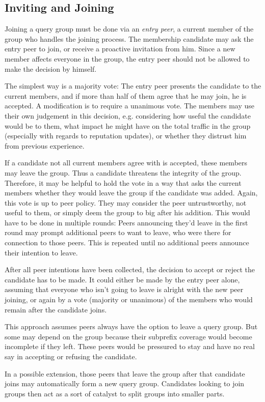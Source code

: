 \subsection{Inviting and Joining}
Joining a query group must be done via an \emph{entry peer}, a current member of
the group who handles the joining process. The membership candidate may ask the
entry peer to join, or receive a proactive invitation from him. Since a new
member affects everyone in the group, the entry peer should not be allowed to
make the decision by himself.

The simplest way is a majority vote: The entry peer presents the candidate to
the current members, and if more than half of them agree that he may join, he is
accepted. A modification is to require a unanimous vote. The members may use
their own judgement in this decision, e.g. considering how useful the candidate
would be to them, what impact he might have on the total traffic in the group
(especially with regards to reputation updates), or whether they distrust him
from previous experience.

If a candidate not all current members agree with is accepted, these members may
leave the group. Thus a candidate threatens the integrity of the group.
Therefore, it may be helpful to hold the vote in a way that asks the current
members whether they would leave the group if the candidate was added. Again,
this vote is up to peer policy. They may consider the peer untrustworthy, not
useful to them, or simply deem the group to big after his addition. This would
have to be done in multiple rounds: Peers announcing they'd leave in the first
round may prompt additional peers to want to leave, who were there for
connection to those peers. This is repeated until no additional peers announce
their intention to leave.

After all peer intentions have been collected, the decision to accept or reject
the candidate has to be made. It could either be made by the entry peer alone,
assuming that everyone who isn't going to leave is alright with the new peer
joining, or again by a vote (majority or unanimous) of the members who would
remain after the candidate joins.

This approach assumes peers always have the option to leave a query group. But
some may depend on the group because their subprefix coverage would become
incomplete if they left. These peers would be pressured to stay and have no real
say in accepting or refusing the candidate.

In a possible extension, those peers that leave the group after that candidate
joins may automatically form a new query group. Candidates looking to join
groups then act as a sort of catalyst to split groups into smaller parts.

